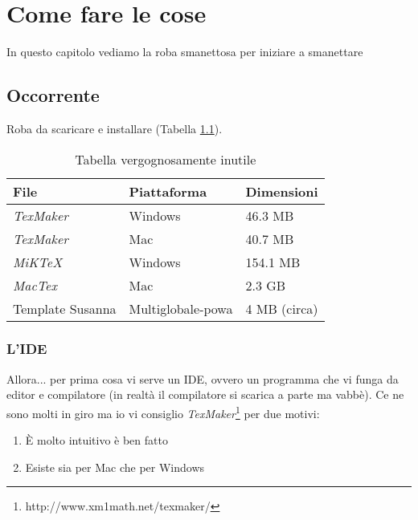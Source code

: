 
\chapter{Come fare le cose}
\label{chap:omfglol}

In questo capitolo vediamo la roba smanettosa per iniziare a smanettare


\section{Occorrente}
\label{sec:occorrente}

Roba da scaricare e installare (Tabella \ref{tab:filesize}).

\begin{table}[h]
\centering
\caption{Tabella vergognosamente inutile}
\vspace{0.3cm}
\label{tab:filesize}
\begin{tabular}{lll}
 \hline
File & Piattaforma & Dimensioni \\\hline
\emph{TexMaker} & Windows & 46.3 MB \\
\emph{TexMaker} & Mac & 40.7 MB \\
\emph{MiKTeX} & Windows & 154.1 MB \\
\emph{MacTex} & Mac & 2.3 GB \\
Template Susanna & Multiglobale-powa & 4 MB (circa) \\\hline
\end{tabular}
\end{table}

\pagebreak


\subsection{L'IDE}
\label{sub:ide}

Allora... per prima cosa vi serve un IDE, ovvero un programma che vi funga da editor e compilatore (in realtà il compilatore si scarica a parte ma vabbè). Ce ne sono molti in giro ma io vi consiglio \emph{TexMaker}\footnote{http://www.xm1math.net/texmaker/} per due motivi:

\begin{enumerate}
\item È molto intuitivo è ben fatto
\item Esiste sia per Mac che per Windows
\end{enumerate}

